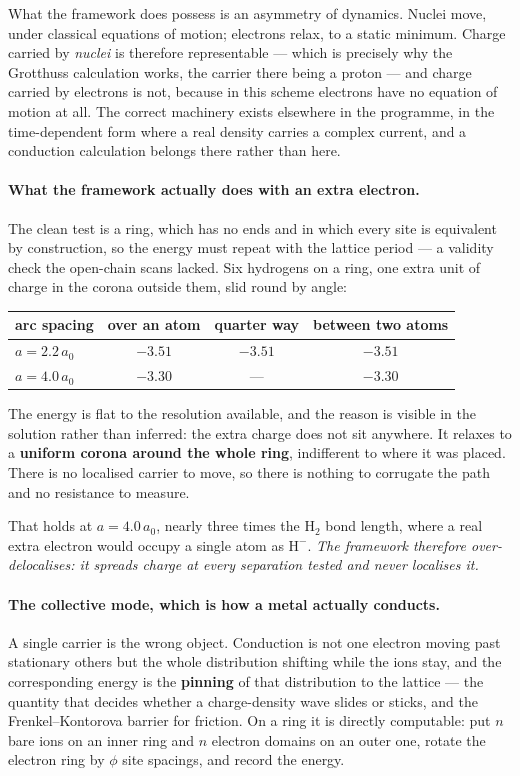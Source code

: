 \documentclass[11pt]{article}
\begin{document}
What the framework does possess is an asymmetry of dynamics. Nuclei move, under classical equations
of motion; electrons relax, to a static minimum. Charge carried by \emph{nuclei} is therefore
representable --- which is precisely why the Grotthuss calculation works, the carrier there being a
proton --- and charge carried by electrons is not, because in this scheme electrons have no equation
of motion at all. The correct machinery exists elsewhere in the programme, in the time-dependent form
where a real density carries a complex current, and a conduction calculation belongs there rather
than here.

\paragraph{What the framework actually does with an extra electron.} The clean test is a ring, which
has no ends and in which every site is equivalent by construction, so the energy must repeat with the
lattice period --- a validity check the open-chain scans lacked. Six hydrogens on a ring, one extra
unit of charge in the corona outside them, slid round by angle:

\begin{center}
\small
\begin{tabular}{@{}lccc@{}}
\toprule
arc spacing & over an atom & quarter way & between two atoms\\
\midrule
$a=2.2\,a_0$ & $-3.51$ & $-3.51$ & $-3.51$\\
$a=4.0\,a_0$ & $-3.30$ & --- & $-3.30$\\
\bottomrule
\end{tabular}
\end{center}

\noindent The energy is flat to the resolution available, and the reason is visible in the solution
rather than inferred: the extra charge does not sit anywhere. It relaxes to a \textbf{uniform corona
around the whole ring}, indifferent to where it was placed. There is no localised carrier to move, so
there is nothing to corrugate the path and no resistance to measure.

That holds at $a=4.0\,a_0$, nearly three times the $\mathrm{H_2}$ bond length, where a real extra
electron would occupy a single atom as $\mathrm{H^-}$. \emph{The framework therefore
over-delocalises: it spreads charge at every separation tested and never localises it.}

\paragraph{The collective mode, which is how a metal actually conducts.} A single carrier is the
wrong object. Conduction is not one electron moving past stationary others but the whole distribution
shifting while the ions stay, and the corresponding energy is the \textbf{pinning} of that
distribution to the lattice --- the quantity that decides whether a charge-density wave slides or
sticks, and the Frenkel--Kontorova barrier for friction. On a ring it is directly computable: put $n$
bare ions on an inner ring and $n$ electron domains on an outer one, rotate the electron ring by
$\phi$ site spacings, and record the energy.
\end{document}

